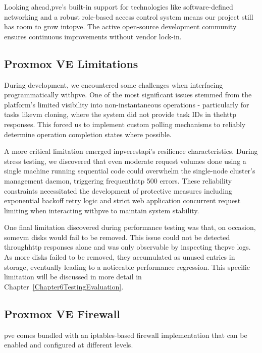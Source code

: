         Looking ahead,\ac{pve}'s built-in support for technologies like software-defined networking and a robust role-based access control 
        system means our project still has room to grow into\ac{pve}. The active open-source development community ensures continuous 
        improvements without vendor lock-in.

    \subsection{Proxmox VE Limitations}

        During development, we encountered some challenges when interfacing programmatically with\ac{pve}. One of the most significant 
        issues stemmed from the platform's limited visibility into non-instantaneous operations - particularly for tasks like\ac{vm} cloning, 
        where the system did not provide task IDs in the\ac{http} responses. This forced us to implement custom polling mechanisms to reliably 
        determine operation completion states where possible.

        A more critical limitation emerged in\ac{pve}\ac{rest}\ac{api}'s resilience characteristics. During stress testing, we discovered that 
        even moderate request volumes done using a single machine running sequential code could overwhelm the single-node cluster's management 
        daemon, triggering frequent\ac{http} 500 errors. These reliability constraints necessitated the development of protective measures 
        including exponential backoff retry logic and strict web application concurrent request limiting when interacting with\ac{pve} to maintain 
        system stability.

        One final limitation discovered during performance testing was that, on occasion, some\ac{vm} disks would fail to be removed. This issue 
        could not be detected through\ac{http} responses alone and was only observable by inspecting the\ac{pve} logs. As more disks failed to be 
        removed, they accumulated as unused entries in storage, eventually leading to a noticeable performance regression. This specific limitation 
        will be discussed in more detail in Chapter~\ref{Chapter6TestingEvaluation}.

    \subsection{Proxmox VE Firewall}

        \ac{pve} comes bundled with an iptables-based firewall implementation that can be enabled and configured at different levels.

